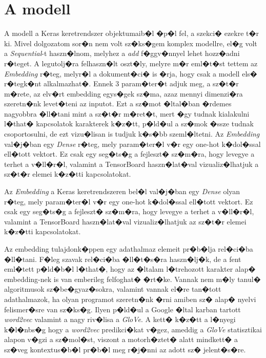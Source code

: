\documentclass[12pt]{report}
\theoremstyle{definition}
\begin{document}
\section{A modell}

A modell a Keras keretrendszer objektumaib�l �p�l fel, a szekci� ezekre t�r ki. 
Mivel dolgozatom sor�n nem volt sz�ks�gem komplex modellre, el�g volt a 
\textit{Sequential}-t haszn�lnom, melyhez a \textit{add} f�ggv�nnyel lehet 
hozz�adni r�teget. A legutolj�ra felhaszn�lt oszt�ly, melyre m�r eml�t�st 
tettem az \textit{Embedding} r�teg, melyr�l a dokument�ci� is �rja, hogy csak a 
modell els� r�tegk�nt alkalmazhat�. Ennek 3 param�ter�t adjuk meg, a sz�t�r 
m�rete, az elv�rt embedding egys�gek sz�ma, azaz mennyi dimenzi�ra szeretn�nk 
levet�teni az inputot. Ezt a sz�mot �ltal�ban �rdemes nagyobbra �ll�tani mint a 
sz�t�r m�ret�t, %
mert �gy tudnak kialakulni l�that� kapcsolatok karakterek k�z�tt, p�ld�ul a 
sz�mok �ssze tudnak csoportosulni, de ezt vizu�lisan is tudjuk k�s�bb 
szeml�ltetni.
Az \textit{Embedding} val�j�ban egy \textit{Dense} r�teg, mely param�ter�l v�r egy one-hot k�dol�ssal ell�tott vektort. Ez csak egy seg�ts�g a fejleszt� sz�m�ra, hogy levegye a terhet a v�ll�r�l, valamint a
TensorBoard haszn�lat�val vizualiz�lhatjuk a sz�t�r elemei k�z�tti 
kapcsolatokat.

Az \textit{Embedding} a Keras keretrendszeren bel�l val�j�ban egy \textit{Dense} olyan r�teg, mely param�ter�l v�r egy one-hot k�dol�ssal ell�tott vektort. Ez csak egy seg�ts�g a fejleszt� sz�m�ra, hogy levegye a terhet a v�ll�r�l, valamint a TensorBoard haszn�lat�val vizualiz�lhatjuk az sz�t�r elemei k�z�tti kapcsolatokat.

Az embedding tulajdonk�ppen egy adathalmaz elemeit pr�b�lja rel�ci�ba �ll�tani. F�leg szavak rel�ci�ba �ll�t�s�ra haszn�lj�k, de a fent eml�tett p�ld�b�l l�that�, hogy az �ltalam l�trehozott karakter alap� embedding-nek is van emberileg felfoghat� �rt�ke. Vannak nem m�ly tanul� algoritmusok sz�be�gyaz�sokra, valamint vannak el�re tan�tott adathalmazok, ha olyan programot szeretn�nk �rni amiben sz� alap� nyelvi felismer�sre van sz�ks�g. Ilyen p�ld�ul a Google �ltal karban tartott \textit{word2vec} valamint a nagy riv�lisa a \textit{GloVe}. A kett� k�z�tt a l�nyegi k�l�nbs�g hogy a \textit{word2vec} predikci�kat v�gez, ameddig a \textit{GloVe} statisztikai alapon v�gzi a sz�mol�st, viszont a motorh�ztet� alatt mindkett� a sz�veg kontextus�b�l pr�b�l meg r�j�nni az adott sz� jelent�s�re.
\end{document}
